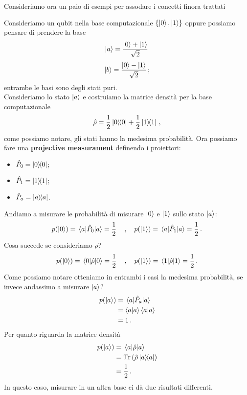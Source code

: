 \noindent Consideriamo ora un paio di esempi per assodare i concetti finora trattati
\begin{esempio}
    Consideriamo un qubit nella base computazionale $\{\ket 0, \ket 1\}$ oppure possiamo pensare di prendere la base
    \begin{equation*}
        \ket a = \frac{\ket 0 +\ket 1}{\sqrt 2} \,
    \end{equation*}
    \begin{equation*}
        \ket b = \frac{\ket 0 -\ket 1}{\sqrt 2} \, ;
    \end{equation*}
    entrambe le basi sono degli stati puri.\\
    Consideriamo lo stato $\ket a$ e costruiamo la matrice densità per la base computazionale
    \begin{equation*}
        \hat \rho = \frac 12 \op{0}{0} + \frac 12 \op{1}{1} \, ,
    \end{equation*}
    come possiamo notare, gli stati hanno la medesima probabilità. Ora possiamo fare una \textbf{projective measurament} definendo i proiettori:
    \begin{itemize}
        \item $\hat P_0=\op{0}{0}$;
        \item $\hat P_1=\op{1}{1}$;
        \item $\hat P_a=\op{a}{a}$.
    \end{itemize}
    Andiamo a misurare le probabilità di misurare $\ket 0$ e $\ket 1$ sullo stato $\ket a$:
    \begin{equation*}
        p(\ket 0)=\mel{a}{\hat P_0}{a}=\frac 12 \quad \, , \quad p(\ket 1)=\mel{a}{\hat P_1}{a}=\frac 12 \, .
    \end{equation*}
    Cosa succede se consideriamo $\rho$?
    \begin{equation*}
        p(\ket 0)=\mel{0}{\hat \rho}{0}=\frac 12 \quad \, , \quad p(\ket 1)=\mel{1}{\hat \rho}{1}=\frac 12 \, .
    \end{equation*}
    Come possiamo notare otteniamo in entrambi i casi la medesima probabilità, se invece andassimo a misurare $\ket a$?
    \begin{equation*}
        \begin{aligned}
            p(\ket a) &= \mel{a}{\hat P_a}{a} \\
                      &= \ip{a}{a}\ip{a}{a} \\
                      &= 1 \, .
        \end{aligned}
    \end{equation*}
    Per quanto riguarda la matrice densità
    \begin{equation*}
        \begin{aligned}
            p(\ket a) &= \mel{a}{\hat \rho}{a} \\
                      &= \Tr \left(\hat \rho \op{a}{a}\right) \\
                      &= \frac 12 \, .
        \end{aligned}
    \end{equation*}
    In questo caso, misurare in un altra base ci dà due risultati differenti.
\end{esempio}
